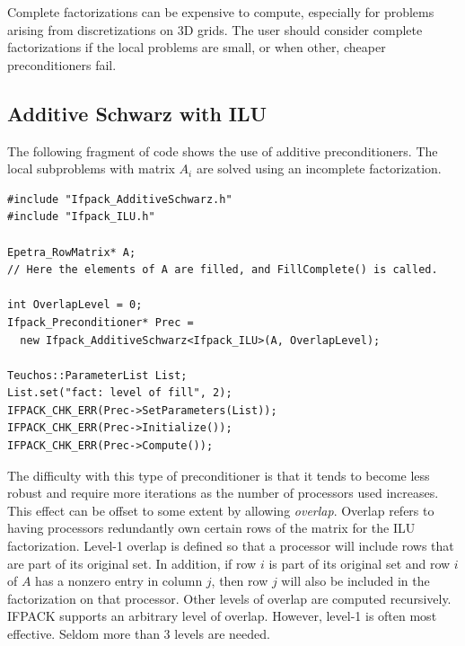 \begin{remark}
Complete factorizations can be expensive to compute, especially for problems
arising from discretizations on 3D grids. The user should consider complete
factorizations if the local problems are small, or when other, cheaper
preconditioners fail.
\end{remark}

\subsection{Additive Schwarz with ILU}
\label{sec:as_ilu}

The following fragment of code shows the use of additive preconditioners. The
local subproblems with matrix $A_i$ are solved using an incomplete
factorization.
\begin{verbatim}
#include "Ifpack_AdditiveSchwarz.h"
#include "Ifpack_ILU.h"

Epetra_RowMatrix* A;
// Here the elements of A are filled, and FillComplete() is called.

int OverlapLevel = 0;
Ifpack_Preconditioner* Prec = 
  new Ifpack_AdditiveSchwarz<Ifpack_ILU>(A, OverlapLevel);

Teuchos::ParameterList List;
List.set("fact: level of fill", 2);
IFPACK_CHK_ERR(Prec->SetParameters(List));
IFPACK_CHK_ERR(Prec->Initialize());
IFPACK_CHK_ERR(Prec->Compute());
\end{verbatim}

The difficulty with this type of preconditioner is that it tends to become
less robust and require more iterations as the number of processors used
increases.  This effect can be offset to some extent by allowing {\em
overlap}.  Overlap refers to having processors redundantly own certain rows
of the matrix for the ILU factorization.  Level-1 overlap is defined so
that a processor will include rows that are part of its original set.  In
addition, if row $i$ is part of its original set and row $i$ of $A$ has a
nonzero entry in column $j$, then row $j$ will also be included in the
factorization on that processor.  Other levels of overlap are computed
recursively.  IFPACK supports an arbitrary level of overlap.  However,
level-1 is often most effective.  Seldom more than 3 levels are needed. 

\smallskip

